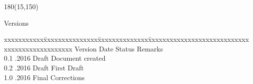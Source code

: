 
\begin{textblock}{180}(15,150)
\color{black}
\begin{huge}
Versions
\end{huge}
\vspace{10mm}

\fontsize{10pt}{18pt}\selectfont
\begin{tabbing}
xxxxxxxxxxx\=xxxxxxxxxxxxxxx\=xxxxxxxxxxxxxx\=xxxxxxxxxxxxxxxxxxxxxxxxxxxxxxxxxxxxxxxxxxxxxxx \kill
Version	\> Date	\> Status			\> Remarks		\\
0.1	.2016	\> Draft		\> Document created	\\	
0.2	.2016	\> Draft		\> First Draft	\\ 
1.0	.2016	\> Final		\> Corrections	\\ 
\end{tabbing}

\end{textblock}

